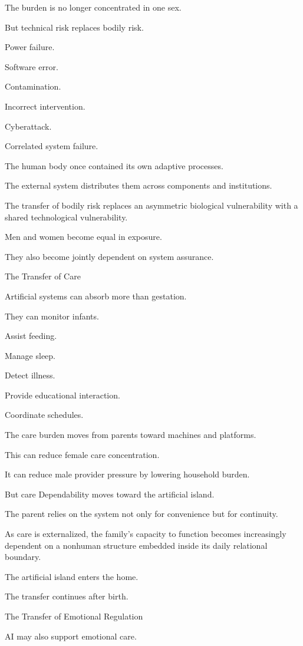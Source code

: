 The burden is no longer concentrated in one sex.

But technical risk replaces bodily risk.

Power failure.

Software error.

Contamination.

Incorrect intervention.

Cyberattack.

Correlated system failure.

The human body once contained its own adaptive processes.

The external system distributes them across components and institutions.

The transfer of bodily risk replaces an asymmetric biological vulnerability with a shared technological vulnerability.

Men and women become equal in exposure.

They also become jointly dependent on system assurance.

The Transfer of Care

Artificial systems can absorb more than gestation.

They can monitor infants.

Assist feeding.

Manage sleep.

Detect illness.

Provide educational interaction.

Coordinate schedules.

The care burden moves from parents toward machines and platforms.

This can reduce female care concentration.

It can reduce male provider pressure by lowering household burden.

But care Dependability moves toward the artificial island.

The parent relies on the system not only for convenience but for continuity.

As care is externalized, the family’s capacity to function becomes increasingly dependent on a nonhuman structure embedded inside its daily relational boundary.

The artificial island enters the home.

The transfer continues after birth.

The Transfer of Emotional Regulation

AI may also support emotional care.

